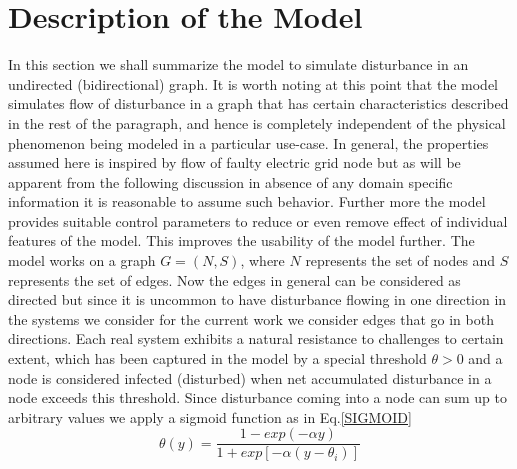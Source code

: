 \documentclass[11pt]{article}
\begin{document}
\section{Description of the Model}
In this section we shall summarize the model to simulate disturbance in an undirected (bidirectional) graph. It is worth noting at this point that the model simulates flow of disturbance in a graph that has certain characteristics described in the rest of the paragraph, and hence is completely independent of the physical phenomenon being modeled in a particular use-case. In general, the properties assumed here is inspired by flow of faulty electric grid node but as will be apparent from the following discussion in absence of any domain specific information it is reasonable to assume such behavior. Further more the model provides suitable control parameters to reduce or even remove effect of individual features of the model. This improves the usability of the model further. The model works on a graph $G = (N, S)$, where $N$ represents the set of nodes and $S$ represents the set of edges. Now the edges in general can be considered as directed but since it is uncommon to have disturbance flowing in one direction in the systems we consider for the current work we consider edges that go in both directions. Each real system exhibits a natural resistance to challenges to certain extent, which has been captured in the model by a special threshold $\theta > 0$ and a node is considered infected (disturbed) when net accumulated disturbance in a node exceeds this threshold. Since disturbance coming into a node can sum up to arbitrary values we apply a sigmoid function as in Eq.\ref{SIGMOID}
\begin{equation}
\theta(y) = \frac{1-exp(-\alpha y)}{1+exp[-\alpha(y-\theta_i)]} 
\label{SIGMOID}
\end{equation}\\
\end{document}
